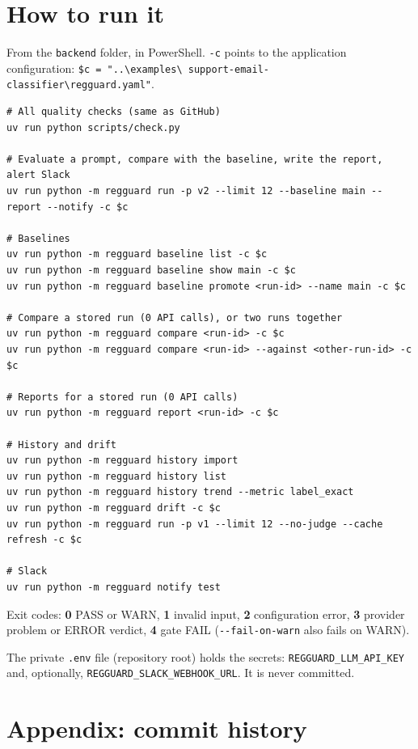 \documentclass[11pt,a4paper]{article}
\newcommand{\code}[1]{\nolinkurl{#1}}
\begin{document}
\section{How to run it}

From the \code{backend} folder, in PowerShell. \texttt{-c} points to the application
configuration: \texttt{\$c = "..\textbackslash examples\textbackslash
support-email-classifier\textbackslash regguard.yaml"}.

\begin{Verbatim}[fontsize=\small,frame=single]
# All quality checks (same as GitHub)
uv run python scripts/check.py

# Evaluate a prompt, compare with the baseline, write the report, alert Slack
uv run python -m regguard run -p v2 --limit 12 --baseline main --report --notify -c $c

# Baselines
uv run python -m regguard baseline list -c $c
uv run python -m regguard baseline show main -c $c
uv run python -m regguard baseline promote <run-id> --name main -c $c

# Compare a stored run (0 API calls), or two runs together
uv run python -m regguard compare <run-id> -c $c
uv run python -m regguard compare <run-id> --against <other-run-id> -c $c

# Reports for a stored run (0 API calls)
uv run python -m regguard report <run-id> -c $c

# History and drift
uv run python -m regguard history import
uv run python -m regguard history list
uv run python -m regguard history trend --metric label_exact
uv run python -m regguard drift -c $c
uv run python -m regguard run -p v1 --limit 12 --no-judge --cache refresh -c $c

# Slack
uv run python -m regguard notify test
\end{Verbatim}

Exit codes: \textbf{0} PASS or WARN, \textbf{1} invalid input, \textbf{2} configuration
error, \textbf{3} provider problem or ERROR verdict, \textbf{4} gate FAIL
(\texttt{-{}-fail-on-warn} also fails on WARN).

The private \code{.env} file (repository root) holds the secrets: \code{REGGUARD_LLM_API_KEY}
and, optionally, \code{REGGUARD_SLACK_WEBHOOK_URL}. It is never committed.

\section{Appendix: commit history}
\end{document}
